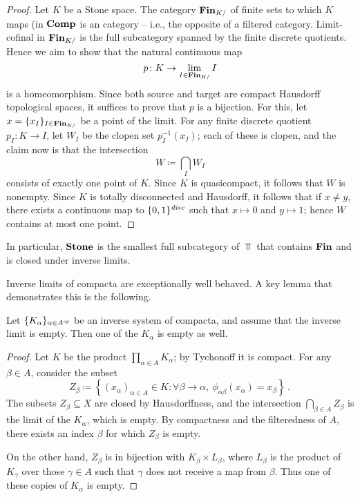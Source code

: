 \begin{proof}
	Let $ K $ be a Stone space.
	The category $ \textbf{\textup{Fin}}_{K/} $ of finite sets to which $ K $ maps (in $ \textbf{\textup{Comp}} $ is an  category -- i.e., the opposite of a filtered category.
	Limit-cofinal in $ \textbf{\textup{Fin}}_{K/} $ is the full subcategory spanned by the finite discrete quotients.
	Hence we aim to show that the natural continuous map
	\[
		p \colon K \to \lim_{I \in \textbf{\textup{Fin}}_{K/}} I
	\]
	is a homeomorphism.
	Since both source and target are compact Hausdorff topological spaces, it suffices to prove that $ p $ is a bijection.
	For this, let $ x = \{ x_I \}_{I \in \textbf{\textup{Fin}}_{K/}} $ be a point of the limit.
	For any finite discrete quotient $p_I \colon K \to I $, let $ W_I $ be the clopen set $ p_I^{-1}(x_I) $;
	each of these is clopen, and the claim now is that the intersection
	\[
		W \coloneq \bigcap_I W_I
	\]
	consists of exactly one point of $ K $.
	Since $ K $ is quasicompact, it follows that $ W $ is nonempty.
	Since $ K $ is totally disconnected and Hausdorff, it follows that if $ x \neq y $, there exists a continuous map to $\{ 0,1 \}^{\textit{disc}}$ such that $ x \mapsto 0 $ and $ y \mapsto 1 $;
	hence $ W $ contains at most one point.
\end{proof}

\begin{nul}
	In particular, $ \textbf{\textup{Stone}} $ is the smallest full subcategory of $ \Top $ that contains $ \textbf{\textup{Fin}} $ and is closed under inverse limits.
\end{nul}

Inverse limits of compacta are exceptionally well behaved.
A key lemma that demonstrates this is the following.

\begin{lem} \label{emptyinverselimitofcompacta}
	Let $ \{ K_{\alpha} \}_{\alpha \in A^{\textit{op}}} $ be an inverse system of compacta, and assume that the inverse limit is empty.
	Then one of the $ K_{\alpha} $ is empty as well.
\end{lem}

\begin{proof}
	Let $ K $ be the product $\prod_{\alpha \in A} K_{\alpha}$;
	by Tychonoff it is compact.
	For any $ \beta \in A $, consider the subset
	\[
		Z_{\beta} \coloneq \left\{ (x_{\alpha})_{\alpha \in A} \in K : \forall \beta \to \alpha,\ \phi_{\alpha\beta} (x_{\alpha}) = x_{\beta} \right\} \period
	\]
	The subsets $Z_{\beta} \subseteq X$ are closed by Hausdorffness, and the intersection $\bigcap_{\beta \in A} Z_{\beta}$ is the limit of the $ K_{\alpha} $, which is empty.
	By compactness and the filteredness of $ A $, there exists an index $ \beta $ for which $ Z_{\beta} $ is empty.

	On the other hand, $Z_{\beta}$ is in bijection with $ K_{\beta} \times L_{\beta} $, where $ L_{\beta} $ is the product of $ K_{\gamma} $ over those $ \gamma \in A $ such that $ \gamma $ does not receive a map from $ \beta $.
	Thus one of these copies of $ K_{\alpha} $ is empty.
\end{proof}


